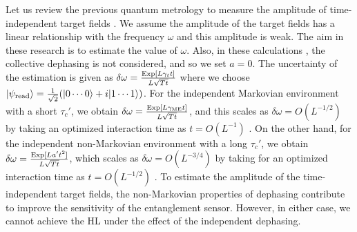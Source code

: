 \documentclass[prl,twocolumn,superscriptaddress]{revtex4}
\begin{document}
Let us review the previous  quantum metrology to measure the
amplitude of time-independent target fields \cite{huelga1997improvement,matsuzaki2011magnetic,chin2012quantum,tanaka2015proposed}. We assume the
amplitude of the target fields has a linear relationship with the frequency
$\omega $ and this amplitude is weak.
The aim in these research is to estimate the value of $\omega $.
Also, in these calculations \cite{huelga1997improvement,matsuzaki2011magnetic,chin2012quantum,tanaka2015proposed},
the collective dephasing is not considered, and so we set $a=0$. The
uncertainty of the estimation is given as $\delta \omega =\frac{{\rm{Exp}}[L\gamma _tt]}{L\sqrt{Tt}}$
where we choose $|\psi _{\rm{read}}\rangle =\frac{1}{\sqrt{2}}(|0\cdots
0\rangle +i|1\cdots 1\rangle )$.
For the
independent Markovian environment
with
a short $\tau
_c'$, we obtain $\delta \omega =\frac{{\rm{Exp}}[L\gamma
_{\rm{ME}}t]}{L\sqrt{Tt}}$, and this scales as $\delta \omega
=O(L^{-1/2})$ by taking an optimized interaction time  as
$t=O(L^{-1})$ \cite{huelga1997improvement}.
On the other hand,
for the
independent non-Markovian environment
with
a long $\tau
_c'$, we obtain $\delta \omega
=\frac{{{\rm{Exp}}}[La't^2]}{L\sqrt{Tt}}$,
\textcolor{black}{which}
scales as $\delta \omega
=O(L^{-3/4})$ by taking for an optimized interaction time as
$t=O(L^{-1/2})$
\cite{jones2009magnetic,matsuzaki2011magnetic,chin2012quantum,tanaka2015proposed}.
To estimate the amplitude of the time-independent
target fields, the non-Markovian properties of dephasing contribute to improve
the sensitivity of the entanglement sensor.
However, in either case, we cannot achieve the HL
under the effect
of the independent dephasing.

\end{document}
